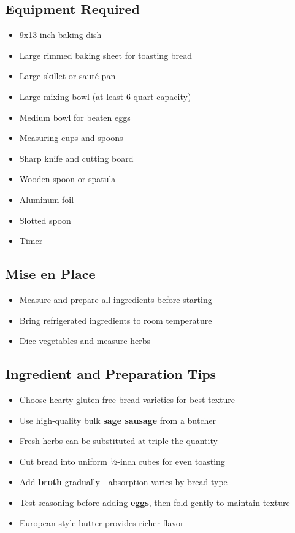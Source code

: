 \documentclass[11pt,letterpaper]{article}
\begin{document}
{\small
\setlength{\columnsep}{20pt}
\setlength{\multicolsep}{6pt}
\begin{multicols}{2}
\setlength{\parindent}{0pt}
\setlength{\parskip}{4pt}

\subsection*{Equipment Required}
\begin{itemize}
    \item 9x13 inch baking dish
    \item Large rimmed baking sheet for toasting bread
    \item Large skillet or sauté pan
    \item Large mixing bowl (at least 6-quart capacity)
    \item Medium bowl for beaten eggs
    \item Measuring cups and spoons
    \item Sharp knife and cutting board
    \item Wooden spoon or spatula
    \item Aluminum foil
    \item Slotted spoon
    \item Timer
\end{itemize}

\subsection*{Mise en Place}
\begin{itemize}
    \item Measure and prepare all ingredients before starting
    \item Bring refrigerated ingredients to room temperature
    \item Dice vegetables and measure herbs
\end{itemize}

\subsection*{Ingredient and Preparation Tips}
\begin{itemize}
    \item Choose hearty gluten-free bread varieties for best texture
    \item Use high-quality bulk \textbf{sage sausage} from a butcher
    \item Fresh herbs can be substituted at triple the quantity
    \item Cut bread into uniform ½-inch cubes for even toasting
    \item Add \textbf{broth} gradually - absorption varies by bread type
    \item Test seasoning before adding \textbf{eggs}, then fold gently to maintain texture
    \item European-style butter provides richer flavor
\end{itemize}


\end{multicols}}
\end{document}
